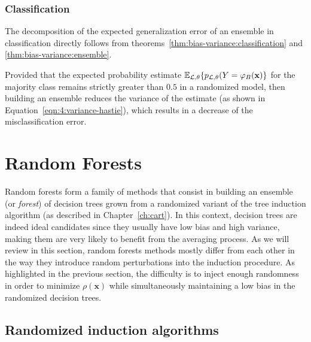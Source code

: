 \subsubsection{Classification}

The decomposition of the expected generalization error of an ensemble in
classification directly follows from theorems~\ref{thm:bias-variance:classification} and
\ref{thm:bias-variance:ensemble}.

Provided that the expected probability estimate $\mathbb{E}_{{\cal L},\theta}\{
p_{{\cal L},\theta}(Y=\varphi_B(\mathbf{x}) \}$ for the majority class remains
strictly greater than $0.5$ in a randomized model, then building an ensemble
reduces the variance of the estimate (as shown in Equation~\ref{eqn:4:variance-hastie}),
which results in a decrease of the misclassification error.


\section{Random Forests}
\label{sec:4:random-forests}

Random forests form a family of methods that consist in building an ensemble
(or \textit{forest}) of decision trees grown from a randomized variant of the
tree induction algorithm (as described in Chapter~\ref{ch:cart}). In this
context, decision trees are indeed ideal candidates since they usually have low
bias and high variance, making them are very likely to benefit from the
averaging process. As we will review in this section, random forests methods
mostly differ from each other in the way they introduce random perturbations
into the induction procedure. As highlighted in the previous section, the
difficulty is to inject enough randomness in order to minimize
$\rho(\mathbf{x})$ while simultaneously maintaining a low bias in the
randomized decision trees.

\subsection{Randomized induction algorithms}





